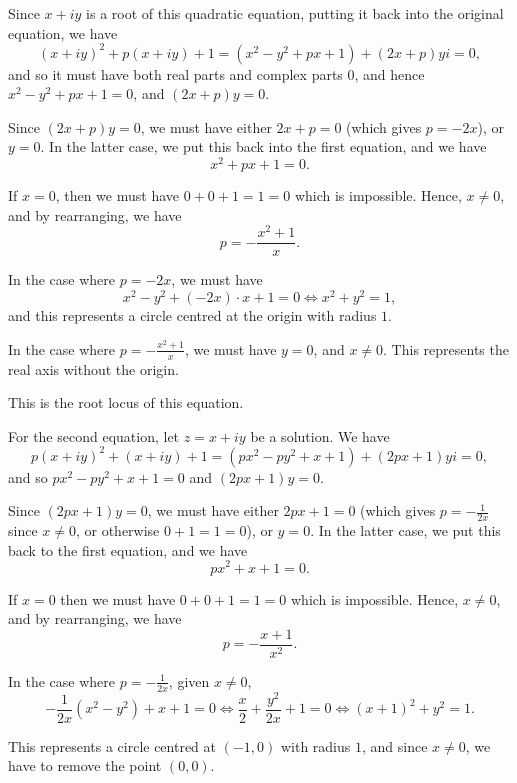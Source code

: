 \Question{\currfilebase}

Since \(x + iy\) is a root of this quadratic equation, putting it back into the original equation, we have
\[
    (x + iy)^2 + p (x + iy) + 1 = (x^2 - y^2 + px + 1) + (2x + p)yi = 0,
\]
and so it must have both real parts and complex parts \(0\), and hence \(x^2 - y^2 + px + 1 = 0\), and \((2x + p)y = 0\).

Since \((2x + p)y = 0\), we must have either \(2x + p = 0\) (which gives \(p = -2x\)), or \(y = 0\). In the latter case, we put this back into the first equation, and we have
\[
    x^2 + px + 1 = 0.
\]

If \(x = 0\), then we must have \(0 + 0 + 1 = 1 = 0\) which is impossible. Hence, \(x \neq 0\), and by rearranging, we have
\[
    p = - \frac{x^2 + 1}{x}.
\]

In the case where \(p = -2x\), we must have
\[
    x^2 - y^2 + (-2x) \cdot x + 1 = 0 \iff x^2 + y^2 = 1,
\]
and this represents a circle centred at the origin with radius \(1\).

In the case where \(p = - \frac{x^2 + 1}{x}\), we must have \(y = 0\), and \(x \neq 0\). This represents the real axis without the origin.

This is the root locus of this equation.

\begin{center}
    
\end{center}

For the second equation, let \(z = x + iy\) be a solution. We have
\[
    p (x + iy)^2 + (x + iy) + 1 = (px^2 - py^2 + x + 1) + (2px + 1)yi = 0,
\]
and so \(px^2 - py^2 + x + 1 = 0\) and \((2px + 1)y = 0\).

Since \((2px + 1)y = 0\), we must have either \(2px + 1 = 0\) (which gives \(p = - \frac{1}{2x}\) since \(x \neq 0\), or otherwise \(0 + 1 = 1 = 0\)), or \(y = 0\). In the latter case, we put this back to the first equation, and we have
\[
    px^2 + x + 1 = 0.
\]

If \(x = 0\) then we must have \(0 + 0 + 1 = 1 = 0\) which is impossible. Hence, \(x \neq 0\), and by rearranging, we have
\[
    p = - \frac{x + 1}{x^2}.
\]

In the case where \(p = - \frac{1}{2x}\), given \(x \neq 0\),
\[
    - \frac{1}{2x} (x^2 - y^2) + x + 1 = 0 \iff \frac{x}{2} + \frac{y^2}{2x} + 1 = 0 \iff (x + 1)^2 + y^2 = 1.
\]

This represents a circle centred at \((-1, 0)\) with radius \(1\), and since \(x \neq 0\), we have to remove the point \((0, 0)\).

